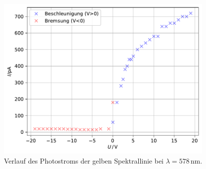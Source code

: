 \begin{figure}
    \centering
    \includegraphics[height = 8cm]{build/plotgelb.pdf}
    \caption{Verlauf des Photostroms der gelben Spektrallinie bei $\lambda = 578 \,\unit{\nm}$.}
    \label{fig:gelb}
\end{figure}


